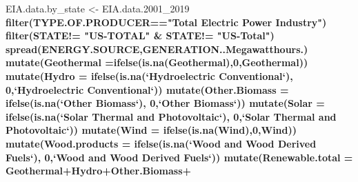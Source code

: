 \documentclass[12pt,]{article}
\newenvironment{Shaded}{\begin{snugshade}}{\end{snugshade}}
\newcommand{\KeywordTok}[1]{\textcolor[rgb]{0.13,0.29,0.53}{\textbf{#1}}}
\newcommand{\DataTypeTok}[1]{\textcolor[rgb]{0.13,0.29,0.53}{#1}}
\newcommand{\DecValTok}[1]{\textcolor[rgb]{0.00,0.00,0.81}{#1}}
\newcommand{\StringTok}[1]{\textcolor[rgb]{0.31,0.60,0.02}{#1}}
\newcommand{\OperatorTok}[1]{\textcolor[rgb]{0.81,0.36,0.00}{\textbf{#1}}}
\newcommand{\NormalTok}[1]{#1}
\begin{document}
\begin{Shaded}
\begin{Highlighting}[]
\NormalTok{EIA.data.by_state <-}\StringTok{ }\NormalTok{EIA.data.2001_}\DecValTok{2019} \OperatorTok{%
\StringTok{  }\KeywordTok{filter}\NormalTok{(TYPE.OF.PRODUCER}\OperatorTok{==}\StringTok{"Total Electric Power Industry"}\NormalTok{) }\OperatorTok{%
\StringTok{  }\KeywordTok{filter}\NormalTok{(STATE}\OperatorTok{!=}\StringTok{ "US-TOTAL"} \OperatorTok{&}\StringTok{ }\NormalTok{STATE}\OperatorTok{!=}\StringTok{ "US-Total"}\NormalTok{) }\OperatorTok{%
\StringTok{  }\KeywordTok{spread}\NormalTok{(ENERGY.SOURCE,GENERATION..Megawatthours.) }\OperatorTok{%
\StringTok{  }\KeywordTok{mutate}\NormalTok{(}\DataTypeTok{Geothermal =}\KeywordTok{ifelse}\NormalTok{(}\KeywordTok{is.na}\NormalTok{(Geothermal),}\DecValTok{0}\NormalTok{,Geothermal)) }\OperatorTok{%
\StringTok{  }\KeywordTok{mutate}\NormalTok{(}\DataTypeTok{Hydro =} \KeywordTok{ifelse}\NormalTok{(}\KeywordTok{is.na}\NormalTok{(}\StringTok{`}\DataTypeTok{Hydroelectric Conventional}\StringTok{`}\NormalTok{),}
                        \DecValTok{0}\NormalTok{,}\StringTok{`}\DataTypeTok{Hydroelectric Conventional}\StringTok{`}\NormalTok{)) }\OperatorTok{%
\StringTok{  }\KeywordTok{mutate}\NormalTok{(}\DataTypeTok{Other.Biomass =} \KeywordTok{ifelse}\NormalTok{(}\KeywordTok{is.na}\NormalTok{(}\StringTok{`}\DataTypeTok{Other Biomass}\StringTok{`}\NormalTok{),}
                                \DecValTok{0}\NormalTok{,}\StringTok{`}\DataTypeTok{Other Biomass}\StringTok{`}\NormalTok{)) }\OperatorTok{%
\StringTok{  }\KeywordTok{mutate}\NormalTok{(}\DataTypeTok{Solar =} \KeywordTok{ifelse}\NormalTok{(}\KeywordTok{is.na}\NormalTok{(}\StringTok{`}\DataTypeTok{Solar Thermal and Photovoltaic}\StringTok{`}\NormalTok{),}
                        \DecValTok{0}\NormalTok{,}\StringTok{`}\DataTypeTok{Solar Thermal and Photovoltaic}\StringTok{`}\NormalTok{)) }\OperatorTok{%
\StringTok{  }\KeywordTok{mutate}\NormalTok{(}\DataTypeTok{Wind =} \KeywordTok{ifelse}\NormalTok{(}\KeywordTok{is.na}\NormalTok{(Wind),}\DecValTok{0}\NormalTok{,Wind)) }\OperatorTok{%
\StringTok{  }\KeywordTok{mutate}\NormalTok{(}\DataTypeTok{Wood.products =} \KeywordTok{ifelse}\NormalTok{(}\KeywordTok{is.na}\NormalTok{(}\StringTok{`}\DataTypeTok{Wood and Wood Derived Fuels}\StringTok{`}\NormalTok{),}
                                \DecValTok{0}\NormalTok{,}\StringTok{`}\DataTypeTok{Wood and Wood Derived Fuels}\StringTok{`}\NormalTok{)) }\OperatorTok{%
\StringTok{  }\KeywordTok{mutate}\NormalTok{(}\DataTypeTok{Renewable.total =}\NormalTok{ Geothermal}\OperatorTok{+}\NormalTok{Hydro}\OperatorTok{+}\NormalTok{Other.Biomass}\OperatorTok{+}
}}}}}}}}}}
\end{Highlighting}
\end{Shaded}
\end{document}
